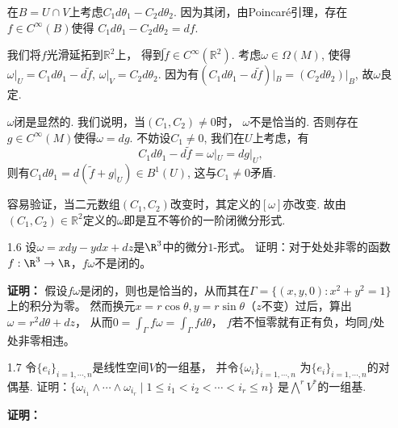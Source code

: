 \begin{enumerate}
        \qquad 在$B=U\cap V$上考虑$C_1d\theta_1-C_2d\theta_2$. 
        因为其闭，由Poincaré引理，存在$f\in C^\infty(B)$使得
        $C_1d\theta_1-C_2d\theta_2=df$.
        
        \qquad 我们将$f$光滑延拓到$\mathbb{R}^2$上，
        得到$\tilde{f}\in C^\infty(\mathbb{R}^2)$. 考虑$\omega\in \Omega(M)$, 
        使得$\omega|_U=C_1d\theta_1-d\tilde{f}$, $\omega|_V=C_2d\theta_2$. 
        因为有$(C_1d\theta_1-d\tilde{f})|_B=(C_2d\theta_2)|_B$, 故$\omega$良定.

        \qquad $\omega$闭是显然的. 我们说明，当$(C_1,C_2)\neq 0$时，
        $\omega$不是恰当的. 否则存在$g\in C^\infty(M)$使得$\omega=dg$. 
        不妨设$C_1\neq 0$, 我们在$U$上考虑，有
            $$C_1d\theta_1-d\tilde{f}=\omega|_U=dg|_U,$$
        则有$C_1d\theta_1=d(\tilde{f}+g|_U)\in B^1(U)$, 这与$C_1\neq 0$矛盾.

        \qquad 容易验证，当二元数组$(C_1,C_2)$改变时，其定义的$[\omega]$亦改变. 
        故由$(C_1,C_2)\in \mathbb{R}^2$定义的$\omega$即是互不等价的一阶闭微分形式.
    
    \item[1.6] 设$\omega=xdy-ydx+dz$是$\R^3$中的微分$1$-形式。
    证明：对于处处非零的函数$f:\R^3\to\R$，$f\omega$不是闭的。
    \item[\textbf{证明：}]
        假设$f\omega$是闭的，则也是恰当的，从而其在$\Gamma=\{(x,y,0):x^2+y^2=1\}$上的积分为零。
        然而换元$x=r\cos\theta,y=r\sin\theta$（$z$不变）过后，算出$\omega=r^2d\theta+dz$，
        从而$0=\int_\Gamma f\omega=\int_\Gamma fd\theta$，
        $f$若不恒零就有正有负，均同$f$处处非零相违。

    \item[1.7] 令$\{e_{i}\}_{i=1,\cdots,n}$是线性空间$V$的一组基，
               并令$\{\omega_{i}\}_{i=1,\cdots,n}$
               为$\{e_{i}\}_{i=1,\cdots,n}$的对偶基.
               证明：$\{\omega_{i_{1}} \wedge \cdots \wedge \omega_{i_{r}} \mid 
               1 \leq i_{1} < i_{2} < \cdots < i_{r} \leq n\}$
               是$\bigwedge\nolimits^{r}V^{*}$的一组基.
    \item[\textbf{证明：}]

\end{enumerate}

